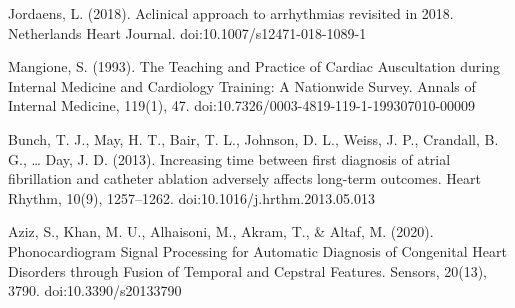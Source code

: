 \documentclass{article}
\begin{document}
\begin{thebibliography}{1}


Jordaens, L. (2018). Aclinical approach to arrhythmias revisited in 2018. Netherlands Heart Journal. doi:10.1007/s12471-018-1089-1 

Mangione, S. (1993). The Teaching and Practice of Cardiac Auscultation during Internal Medicine and Cardiology Training: A Nationwide Survey. Annals of Internal Medicine, 119(1), 47. doi:10.7326/0003-4819-119-1-199307010-00009 

Bunch, T. J., May, H. T., Bair, T. L., Johnson, D. L., Weiss, J. P., Crandall, B. G., … Day, J. D. (2013). Increasing time between first diagnosis of atrial fibrillation and catheter ablation adversely affects long-term outcomes. Heart Rhythm, 10(9), 1257–1262. doi:10.1016/j.hrthm.2013.05.013 

Aziz, S., Khan, M. U., Alhaisoni, M., Akram, T., & Altaf, M. (2020). Phonocardiogram Signal Processing for Automatic Diagnosis of Congenital Heart Disorders through Fusion of Temporal and Cepstral Features. Sensors, 20(13), 3790. doi:10.3390/s20133790 
\end{thebibliography}
\end{document}

